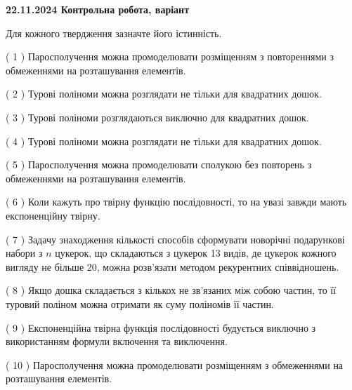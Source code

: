 \documentclass[12pt, ukrainian]{article}
\begin{document}
\vspace{4mm}
\newpage
\begin {large}

\textbf{22.11.2024 Контрольна робота, варіант  }\par


{
Для кожного твердження зазначте його істинність.\par
\vspace{2mm}
( 1 ) Паросполучення можна промоделювати розміщенням з повтореннями з обмеженнями на розташування елементів.%

( 2 ) Турові поліноми можна розглядати не тільки для квадратних дошок.%

( 3 ) Турові поліноми розглядаються виключно для квадратних дошок.%

( 4 ) Турові поліноми можна розглядати не тільки для квадратних дошок.%

( 5 ) Паросполучення можна промоделювати сполукою без повторень з обмеженнями на розташування елементів.%

( 6 ) Коли кажуть про твірну функцію послідовності, то на увазі завжди мають експоненційну твірну.%

( 7 ) Задачу знаходження кількості способів сформувати новорічні подарункові набори з $n$ цукерок, що складаються з цукерок 13 видів, де цукерок кожного вигляду не більше 20, можна розв’язати методом рекурентних співвідношень.%

( 8 ) Якщо дошка складається з кількох не зв’язаних між собою частин, то її туровий поліном можна отримати як суму поліномів її частин.%

( 9 ) Експоненційна твірна функція послідовності будується виключно з використанням формули включення та виключення.%

( 10 ) Паросполучення можна промоделювати розміщенням з обмеженнями на розташування елементів.%


\vspace{5mm}
}
\end {large}
\end{document}
